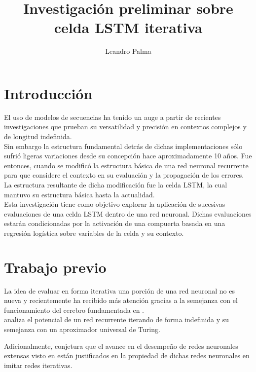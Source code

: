 \documentclass{article}
\title{Investigación preliminar sobre celda LSTM iterativa}
\author{Leandro Palma}
\begin{document}
\maketitle

\section{Introducción}


El uso de modelos de secuencias ha tenido un auge a partir de recientes investigaciones que prueban su versatilidad y precisión en contextos complejos y de longitud indefinida.\\


Sin embargo la estructura fundamental detrás de dichas implementaciones sólo sufrió ligeras variaciones desde su concepción hace aproximadamente 10 años. Fue entonces, cuando se modificó la estructura básica de una red neuronal recurrente para que considere el contexto en su evaluación y la propagación de los errores.\\

La estructura resultante de dicha modificación fue la celda LSTM, la cual mantuvo su estructura básica hasta la actualidad.\\

Esta investigación tiene como objetivo explorar la aplicación de sucesivas evaluaciones de una celda LSTM dentro de una red neuronal. Dichas evaluaciones estarán condicionadas por la activación de una compuerta basada en una regresión logística sobre variables de la celda y su contexto.



\section{Trabajo previo}


La idea de evaluar en forma iterativa una porción de una red neuronal no es nueva y recientemente ha recibido más atención gracias a la semejanza con el funcionamiento del cerebro fundamentada en \cite{investigacionCerebro}.\\


\cite{bringingTheGaps} analiza el potencial de un red recurrente iterando de forma indefinida y su semejanza con un aproximador universal de Turing.


Adicionalmente, conjetura que el avance en el desempeño de redes neuronales extensas visto en \cite{ResNet} están justificados en la propiedad de dichas redes neuronales en imitar redes iterativas.
\end{document}
